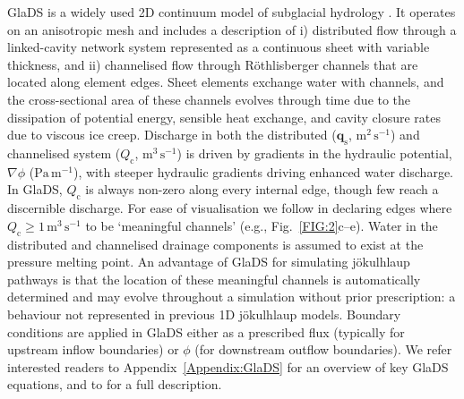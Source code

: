 \documentclass[tc, manuscript]{copernicus}
\begin{document}
GlaDS is a widely used  2D continuum model of subglacial hydrology \citep{dow2019role,  mcarthur2023basal,hayden2023examining,hepburn2024organization,ehrenfeucht2025Antarctic}. It operates on an anisotropic mesh and includes a description of i) distributed flow through a linked-cavity network system represented as a continuous sheet with variable thickness, and ii) channelised flow through Röthlisberger channels that are located along element edges. Sheet elements exchange water with channels, and the cross-sectional area of these channels evolves through time due to the dissipation of potential energy, sensible heat exchange, and cavity closure rates due to viscous ice creep. Discharge in both the distributed ($\bm{q}_{\mathrm{s}}$, $\mathrm{m}^2\, \mathrm{s}^{-1}$) and channelised system ($Q_{\mathrm{c}}$, $\mathrm{m}^{3}\, \mathrm{s}^{-1}$) is driven by gradients in the hydraulic potential, $\nabla \phi$ ($\mathrm{Pa}\,\mathrm{m}^{-1}$), with steeper hydraulic gradients driving enhanced water discharge. In GlaDS, $Q_{\mathrm{c}}$ is always non-zero along every internal edge, though few reach a discernible discharge. For ease of visualisation we follow \citet{werder2013modeling} in declaring edges where $Q_{\mathrm{c}} \geq 1\, \mathrm{m}^{3}\, \mathrm{s}^{-1}$ to be `meaningful channels' (e.g., Fig.~\ref{FIG:2}c--e). Water in the distributed and channelised drainage components is assumed to exist at the pressure melting point. An advantage of GlaDS for simulating jökulhlaup pathways is that the location of these meaningful channels is automatically determined and may evolve throughout a simulation without prior prescription: a behaviour not represented in previous 1D jökulhlaup models. Boundary conditions are applied in GlaDS either as a prescribed flux (typically for upstream inflow boundaries) or $\phi$ (for downstream outflow boundaries). We refer interested readers to Appendix~\ref{Appendix:GlaDS} for an overview of key GlaDS equations, and to \citet{werder2013modeling} for a full description.
\end{document}
